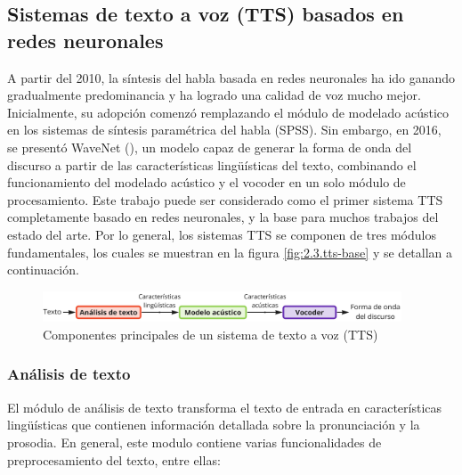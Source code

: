 \subsection{Sistemas de texto a voz (TTS) basados en redes neuronales}

A partir del 2010, la síntesis del habla basada en redes neuronales ha ido ganando gradualmente predominancia y ha logrado una calidad de voz mucho mejor. Inicialmente, su adopción comenzó remplazando el módulo de modelado acústico en los sistemas de síntesis paramétrica del habla (SPSS). Sin embargo, en 2016, se presentó WaveNet (\cite{oord2016}), un modelo capaz de generar la forma de onda del discurso a partir de las características lingüísticas del texto, combinando el funcionamiento del modelado acústico y el vocoder en un solo módulo de procesamiento. Este trabajo puede ser considerado como el primer sistema TTS completamente basado en redes neuronales, y la base para muchos trabajos del estado del arte. Por lo general, los sistemas TTS se componen de tres módulos fundamentales, los cuales se muestran en la figura \eqref{fig:2.3.tts-base} y se detallan a continuación.

\begin{figure}[h]
    \centering
    \includegraphics[width=0.95\textwidth]{figures/2.3.tts-base.png}
    \caption{Componentes principales de un sistema de texto a voz (TTS)}
    \label{fig:2.3.tts-base}
\end{figure}

\subsubsection{Análisis de texto}

El módulo de análisis de texto transforma el texto de entrada en características lingüísticas que contienen información detallada sobre la pronunciación y la prosodia. En general, este modulo contiene varias funcionalidades de preprocesamiento del texto, entre ellas:

